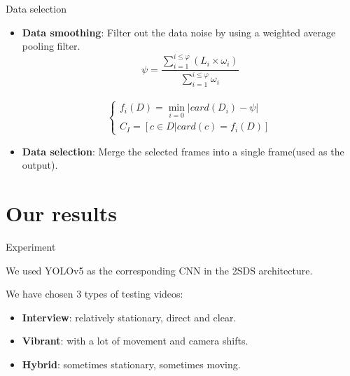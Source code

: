 \documentclass[aspectratio=43,display]{beamer}
\begin{document}
			\begin{frame}{Data selection}
				
				\begin{itemize}
					\item \textbf{Data smoothing}: Filter out the data noise by using a weighted average pooling filter.\\
					$$ \psi = \frac{\sum_{i=1}^{i\leqslant\varphi} (L_i \times \omega_i) }{\sum_{i=1}^{i\leqslant\varphi} \omega_i} $$\\
					$$ 
					    \left\{
							\begin{array}{ll}
								f_i(D) = \min_{i=0} |card(D_i) - \psi| \\
								C_I = [c \in D | card(c) = f_i(D) ]
							\end{array}
						\right. 
					$$
					\item \textbf{Data selection}: Merge the selected frames into a single frame(used as the output).
				\end{itemize}

			\end{frame}


	\section{Our results}

		\begin{frame}{Experiment}

			We used YOLOv5 as the corresponding CNN in the 2SDS architecture.\\ 

			\vskip 0.5cm

			We have chosen 3 types of testing videos:

			\begin{itemize}
				\item \textbf{Interview}: relatively stationary, direct and clear.
				\item \textbf{Vibrant}: with a lot of movement and camera shifts.
				\item \textbf{Hybrid}: sometimes stationary, sometimes moving.
			\end{itemize}

		\end{frame}
\end{document}
